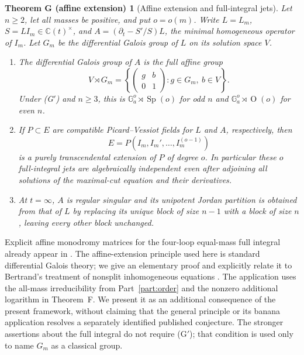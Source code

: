 \documentclass[11pt,a4paper]{article}
\newtheorem*{theoremG}{Theorem G (affine extension)}
\theoremstyle{definition}
\theoremstyle{remark}
\numberwithin{equation}{section}
\newcommand{\C}{\mathbb{C}}
\DeclareMathOperator{\Ort}{O}
\DeclareMathOperator{\Sp}{Sp}
\begin{document}
\begin{theoremG}[Affine extension and full-integral jets]\label{bs:thm:affineintro}
Let $n\ge2$, let all masses be positive, and put $o=o(m)$. Write $L=L_m$, $S=LI_m\in\C(t)^\times$, and $A=(\partial_t-S'/S)L$, the minimal homogeneous operator of $I_m$. Let $G_m$ be the differential Galois group of $L$ on its solution space $V$.
\begin{enumerate}
\item The differential Galois group of $A$ is the full affine group
\[
V\rtimes G_m=\left\{\begin{pmatrix}g&b\\0&1\end{pmatrix}:g\in G_m,\ b\in V\right\}.
\]
Under {\rm(G$'$)} and $n\ge3$, this is $\mathbb G_a^o\rtimes\Sp(o)$ for odd $n$ and $\mathbb G_a^o\rtimes\Ort(o)$ for even $n$.
\item If $P\subset E$ are compatible Picard--Vessiot fields for $L$ and $A$, respectively, then
\[
E=P(I_m,I_m',\ldots,I_m^{(o-1)})
\]
is a purely transcendental extension of $P$ of degree $o$. In particular these $o$ full-integral jets are algebraically independent even after adjoining all solutions of the maximal-cut equation and their derivatives.
\item At $t=\infty$, $A$ is regular singular and its unipotent Jordan partition is obtained from that of $L$ by replacing its unique block of size $n-1$ with a block of size $n$, leaving every other block unchanged.
\end{enumerate}
\end{theoremG}

Explicit affine monodromy matrices for the four-loop equal-mass full integral already appear in \cite[\S3.3, (3.98)]{BDFKN22}. The affine-extension principle used here is standard differential Galois theory; we give an elementary proof and explicitly relate it to Bertrand's treatment of nonsplit inhomogeneous equations \cite[\S1.1, (N.3), and Thm.~1.1]{Ber01}. The application uses the all-mass irreducibility from Part~\ref{part:order} and the nonzero additional logarithm in Theorem~F. We present it as an additional consequence of the present framework, without claiming that the general principle or its banana application resolves a separately identified published conjecture. The stronger assertions about the full integral do not require {\rm(G$'$)}; that condition is used only to name $G_m$ as a classical group.
\end{document}
